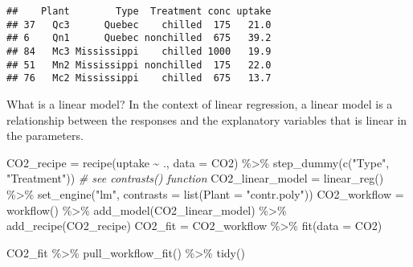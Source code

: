 \documentclass[
]{book}
\newenvironment{Shaded}{\begin{snugshade}}{\end{snugshade}}
\newcommand{\AttributeTok}[1]{\textcolor[rgb]{0.77,0.63,0.00}{#1}}
\newcommand{\CommentTok}[1]{\textcolor[rgb]{0.56,0.35,0.01}{\textit{#1}}}
\newcommand{\FunctionTok}[1]{\textcolor[rgb]{0.00,0.00,0.00}{#1}}
\newcommand{\NormalTok}[1]{#1}
\newcommand{\OtherTok}[1]{\textcolor[rgb]{0.56,0.35,0.01}{#1}}
\newcommand{\SpecialCharTok}[1]{\textcolor[rgb]{0.00,0.00,0.00}{#1}}
\newcommand{\StringTok}[1]{\textcolor[rgb]{0.31,0.60,0.02}{#1}}
\begin{document}
\begin{verbatim}
##    Plant        Type  Treatment conc uptake
## 37   Qc3      Quebec    chilled  175   21.0
## 6    Qn1      Quebec nonchilled  675   39.2
## 84   Mc3 Mississippi    chilled 1000   19.9
## 51   Mn2 Mississippi nonchilled  175   22.0
## 76   Mc2 Mississippi    chilled  675   13.7
\end{verbatim}

What is a linear model? In the context of linear regression, a linear
model is a relationship between the responses and the explanatory
variables that is linear in the parameters.

\begin{Shaded}
\begin{Highlighting}[]
\NormalTok{CO2\_recipe }\OtherTok{=} \FunctionTok{recipe}\NormalTok{(uptake }\SpecialCharTok{\textasciitilde{}}\NormalTok{ ., }\AttributeTok{data =}\NormalTok{ CO2) }\SpecialCharTok{\%\textgreater{}\%}
    \FunctionTok{step\_dummy}\NormalTok{(}\FunctionTok{c}\NormalTok{(}\StringTok{"Type"}\NormalTok{, }\StringTok{"Treatment"}\NormalTok{))}
\CommentTok{\# see contrasts() function}
\NormalTok{CO2\_linear\_model }\OtherTok{=} \FunctionTok{linear\_reg}\NormalTok{() }\SpecialCharTok{\%\textgreater{}\%}
    \FunctionTok{set\_engine}\NormalTok{(}\StringTok{"lm"}\NormalTok{, }\AttributeTok{contrasts =} \FunctionTok{list}\NormalTok{(}\AttributeTok{Plant =} \StringTok{"contr.poly"}\NormalTok{))}
\NormalTok{CO2\_workflow }\OtherTok{=} \FunctionTok{workflow}\NormalTok{() }\SpecialCharTok{\%\textgreater{}\%}
    \FunctionTok{add\_model}\NormalTok{(CO2\_linear\_model) }\SpecialCharTok{\%\textgreater{}\%}
    \FunctionTok{add\_recipe}\NormalTok{(CO2\_recipe)}
\NormalTok{CO2\_fit }\OtherTok{=}\NormalTok{ CO2\_workflow }\SpecialCharTok{\%\textgreater{}\%}
    \FunctionTok{fit}\NormalTok{(}\AttributeTok{data =}\NormalTok{ CO2)}
\end{Highlighting}
\end{Shaded}

\begin{Shaded}
\begin{Highlighting}[]
\NormalTok{CO2\_fit }\SpecialCharTok{\%\textgreater{}\%}
    \FunctionTok{pull\_workflow\_fit}\NormalTok{() }\SpecialCharTok{\%\textgreater{}\%}
    \FunctionTok{tidy}\NormalTok{()}
\end{Highlighting}
\end{Shaded}
\end{document}
